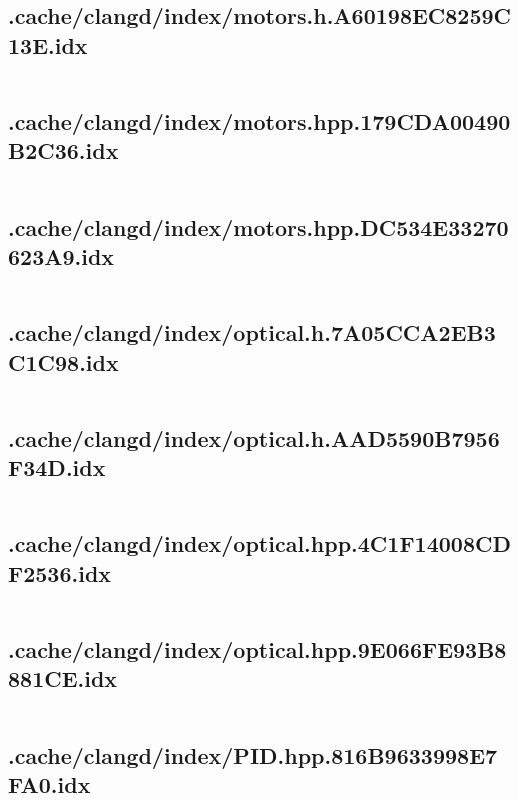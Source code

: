 \subsection{.cache/clangd/index/motors.h.A60198EC8259C13E.idx}
\inputminted[linenos,tabsize=2,breaklines, breakanywhere]{c}{motors.h.A60198EC8259C13E.idx}
\pagebreak

\subsection{.cache/clangd/index/motors.hpp.179CDA00490B2C36.idx}
\inputminted[linenos,tabsize=2,breaklines, breakanywhere]{c}{motors.hpp.179CDA00490B2C36.idx}
\pagebreak

\subsection{.cache/clangd/index/motors.hpp.DC534E33270623A9.idx}
\inputminted[linenos,tabsize=2,breaklines, breakanywhere]{c}{motors.hpp.DC534E33270623A9.idx}
\pagebreak

\subsection{.cache/clangd/index/optical.h.7A05CCA2EB3C1C98.idx}
\inputminted[linenos,tabsize=2,breaklines, breakanywhere]{c}{optical.h.7A05CCA2EB3C1C98.idx}
\pagebreak

\subsection{.cache/clangd/index/optical.h.AAD5590B7956F34D.idx}
\inputminted[linenos,tabsize=2,breaklines, breakanywhere]{c}{optical.h.AAD5590B7956F34D.idx}
\pagebreak

\subsection{.cache/clangd/index/optical.hpp.4C1F14008CDF2536.idx}
\inputminted[linenos,tabsize=2,breaklines, breakanywhere]{c}{optical.hpp.4C1F14008CDF2536.idx}
\pagebreak

\subsection{.cache/clangd/index/optical.hpp.9E066FE93B8881CE.idx}
\inputminted[linenos,tabsize=2,breaklines, breakanywhere]{c}{optical.hpp.9E066FE93B8881CE.idx}
\pagebreak

\subsection{.cache/clangd/index/PID.hpp.816B9633998E7FA0.idx}
\inputminted[linenos,tabsize=2,breaklines, breakanywhere]{c}{PID.hpp.816B9633998E7FA0.idx}
\pagebreak


